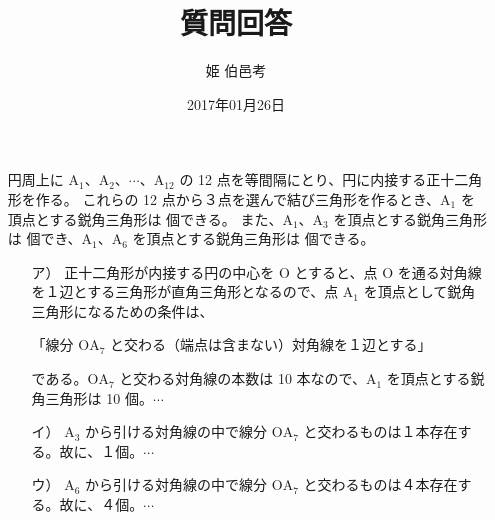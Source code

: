 \documentclass[10pt,a4paper,disablejfam,dvipdfmx,fleqn,onecolumn,oneside,openany,report]{jsarticle}
\title{質問回答} \author{姫 伯邑考} \date{2017年01月26日}
\begin{document}
\maketitle
\begin{itemize}
\item[\ajMaru{3}] 円周上に $\mathrm{A}_{1}$、$\mathrm{A}_{2}$、$\cdots$、$\mathrm{A}_{12}$ の 12 点を等間隔にとり、円に内接する正十二角形を作る。
  これらの 12 点から３点を選んで結び三角形を作るとき、$\mathrm{A}_{1}$ を頂点とする鋭角三角形は  個できる。
  また、$\mathrm{A}_{1}$、$\mathrm{A}_{3}$ を頂点とする鋭角三角形は  個でき、$\mathrm{A}_{1}$、$\mathrm{A}_{6}$ を頂点とする鋭角三角形は  個できる。
  \begin{solve}
    \begin{itemize}
    \item[ア）] 正十二角形が内接する円の中心を $\mathrm{O}$ とすると、点 $\mathrm{O}$ を通る対角線を１辺とする三角形が直角三角形となるので、点 $\mathrm{A}_{1}$ を頂点として鋭角三角形になるための条件は、
      \begin{center}「線分 $\mathrm{OA}_{7}$ と交わる（端点は含まない）対角線を１辺とする」\end{center}
      である。$\mathrm{OA}_{7}$ と交わる対角線の本数は 10 本なので、$\mathrm{A}_{1}$ を頂点とする鋭角三角形は 10 個。$\cdots$ 

    \item[イ）] $\mathrm{A}_{3}$ から引ける対角線の中で線分 $\mathrm{OA}_{7}$ と交わるものは１本存在する。故に、１個。$\cdots$ 

    \item[ウ）] $\mathrm{A}_{6}$ から引ける対角線の中で線分 $\mathrm{OA}_{7}$ と交わるものは４本存在する。故に、４個。$\cdots$ 
    \end{itemize}
  \end{solve}
\end{itemize}
\vspc{-5.00pt}\begin{figure}[H]\centering{}\end{figure}\vspc{-5.00pt}
\end{document}
